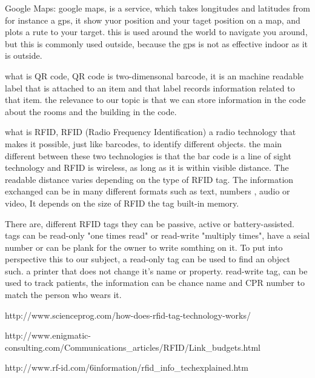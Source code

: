

Google Maps:
google maps, is a service, which takes longitudes and latitudes from for instance a gps, it show yuor position and your taget position on a map, and plots a rute to your target. this is used around the world to navigate you around, but this is commonly used outside, because the gps is not as effective indoor as it is outside.  

what is QR code, QR code is two-dimensonal barcode, it is an machine readable label that is attached to an item and that label records information related to that item. the relevance to our topic is that we can store information in the code about the rooms and the building in the code. 

what is RFID, RFID (Radio Frequency Identification) a radio technology that makes it possible, just like barcodes, to identify different objects. the main different between these two technologies is that the bar code is a line of sight technology and RFID is wireless, as long as it is within visible distance. The readable distance varies depending on the type of RFID tag. The information exchanged can be in many different formats such as text, numbers , audio or video, It depends on the size of RFID the tag built-in memory. 

There are, different RFID tags they can be passive, active or battery-assisted. tags can be read-only "one times read" or read-write "multiply times", have a seial number or can be plank for the owner to write somthing on it. To put into perspective this to our subject, a read-only tag can be used to find an object such. a printer that does not change it's name or property. read-write tag, can be used to track patients, the information can be chance name and CPR number to match the person who wears it.  

http://www.scienceprog.com/how-does-rfid-tag-technology-works/

http://www.enigmatic-consulting.com/Communications_articles/RFID/Link_budgets.html

http://www.rf-id.com/6information/rfid_info_techexplained.htm


